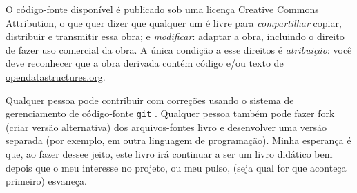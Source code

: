 O código-fonte disponível é publicado sob uma licença 
Creative Commons Attribution,
o que quer dizer que qualquer um é livre para \emph{compartilhar}
copiar, distribuir e
transmitir essa obra; e \emph{modificar}:
adaptar a obra, incluindo o direito
de fazer uso comercial da obra.
A única condição a esse direitos é \emph{atribuição}:
você deve reconhecer que a obra derivada contém código e/ou texto de \url{opendatastructures.org}.

Qualquer pessoa pode contribuir com correções usando o sistema de gerenciamento
de código-fonte \texttt{git}
. Qualquer pessoa também pode fazer fork (criar versão alternativa) dos arquivos-fontes 
livro e desenvolver uma versão separada (por exemplo, em outra linguagem de programação).
Minha esperança é que, ao fazer dessee jeito, este livro irá continuar a
ser um livro didático bem depois que o meu interesse no projeto, ou meu pulso, (seja qual for que 
aconteça primeiro) esvaneça.


